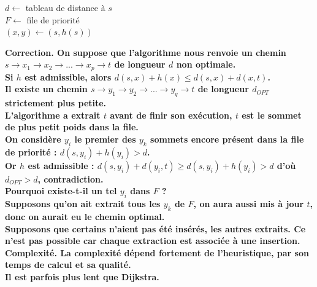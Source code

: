 \documentclass[french, 11pt]{article}
\begin{document}
\begin{defi}{}{}
    \begin{algorithm}[H]
        \caption{Algorithme $A^*$}
        \Sortie{}
        $d\gets$ tableau de distance à $s$\\
        $F\gets$ file de priorité\\
        $(x,y)\gets(s,h(s))$\\
    \end{algorithm}
    \tcblower
    \bf{Correction.}
    On suppose que l'algorithme nous renvoie un chemin $s\to x_1\to x_2 \to ... \to x_p \to t$ de longueur $d$ non optimale.\\
    Si $h$ est admissible, alors $d(s,x)+h(x)\leq d(s,x)+d(x,t)$.\\
    Il existe un chemin $s\to y_1 \to y_2 \to ... \to y_q \to t$ de longueur $d_{OPT}$ strictement plus petite.\\
    L'algorithme a extrait $t$ avant de finir son exécution, $t$ est le sommet de plus petit poids dans la file.\\
    On considère $y_i$ le premier des $y_k$ sommets encore présent dans la file de priorité : $d(s,y_i)+h(y_i) > d$.\\
    Or $h$ est admissible : $d(s,y_i)+d(y_i,t)\geq d(s,y_i)+h(y_i)>d$ d'où $d_{OPT}>d$, contradiction.\\
    Pourquoi existe-t-il un tel $y_i$ dans $F$ ?\\
    Supposons qu'on ait extrait tous les $y_k$ de $F$, on aura aussi mis à jour $t$, donc on aurait eu le chemin optimal.\\
    Supposons que certains n'aient pas été insérés, les autres extraits. Ce n'est pas possible car chaque extraction est associée à une insertion.\\
    \bf{Complexité.}
    La complexité dépend fortement de l'heuristique, par son temps de calcul et sa qualité.\\
    Il est parfois plus lent que Dijkstra.
\end{defi}
\end{document}
